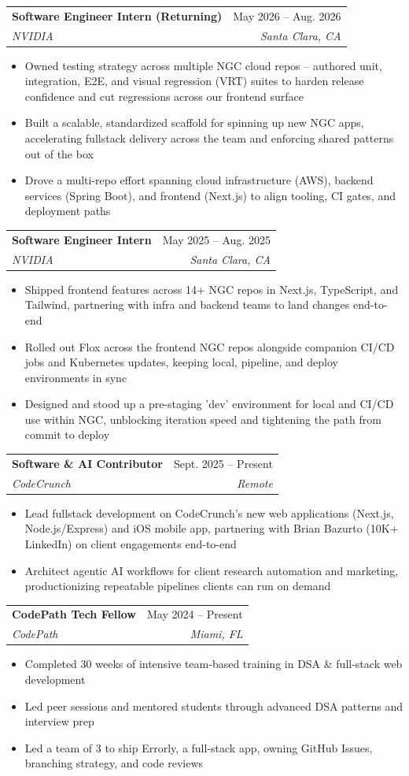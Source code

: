 \documentclass[letterpaper,9pt]{extarticle}
\makeatletter
\newcommand{\resumeItem}[1]{
  \item\small{
    {#1 \vspace{-3pt}}
  }
}
\newcommand{\resumeSubheading}[4]{
  \vspace{0pt}\item
    \begin{tabular*}{0.97\textwidth}[t]{l@{\extracolsep{\fill}}r}
      \textbf{#1} & #2 \\
      \textit{\small#3} & \textit{\small #4} \\
    \end{tabular*}\vspace{-8pt}
}
\newcommand{\resumeItemListStart}{\begin{itemize}}
\newcommand{\resumeItemListEnd}{\end{itemize}\vspace{-6pt}}
\makeatother
\begin{document}
    \resumeSubheading
      {Software Engineer Intern (Returning)}{May 2026 -- Aug. 2026}
      {NVIDIA}{Santa Clara, CA}
      \resumeItemListStart
        \resumeItem{Owned testing strategy across multiple NGC cloud repos -- authored unit, integration, E2E, \newline and visual regression (VRT) suites to harden release confidence and cut regressions across our frontend surface}
        \resumeItem{Built a scalable, standardized scaffold for spinning up new NGC apps, \newline accelerating fullstack delivery across the team and enforcing shared patterns out of the box}
        \resumeItem{Drove a multi-repo effort spanning cloud infrastructure (AWS), backend services (Spring Boot), \newline and frontend (Next.js) to align tooling, CI gates, and deployment paths}
      \resumeItemListEnd

    \resumeSubheading
      {Software Engineer Intern}{May 2025 -- Aug. 2025}
      {NVIDIA}{Santa Clara, CA}
      \resumeItemListStart
        \resumeItem{Shipped frontend features across 14+ NGC repos in Next.js, TypeScript, and Tailwind, \newline partnering with infra and backend teams to land changes end-to-end}
        \resumeItem{Rolled out Flox across the frontend NGC repos alongside companion CI/CD jobs \newline and Kubernetes updates, keeping local, pipeline, and deploy environments in sync}
        \resumeItem{Designed and stood up a pre-staging 'dev' environment for local and CI/CD use within NGC, \newline unblocking iteration speed and tightening the path from commit to deploy}
      \resumeItemListEnd

    \resumeSubheading
      {Software \& AI Contributor}{Sept. 2025 -- Present}
      {CodeCrunch}{Remote}
      \resumeItemListStart
        \resumeItem{Lead fullstack development on CodeCrunch's new web applications (Next.js, Node.js/Express) and iOS mobile app, \newline partnering with Brian Bazurto (10K+ LinkedIn) on client engagements end-to-end}
        \resumeItem{Architect agentic AI workflows for client research automation and marketing, productionizing repeatable pipelines clients can run on demand}
      \resumeItemListEnd

    \resumeSubheading
      {CodePath Tech Fellow}{May 2024 -- Present}
      {CodePath}{Miami, FL}
      \resumeItemListStart
        \resumeItem{Completed 30 weeks of intensive team-based training in DSA \& full-stack web development}
        \resumeItem{Led peer sessions and mentored students through advanced DSA patterns and interview prep}
        \resumeItem{Led a team of 3 to ship Errorly, a full-stack app, owning GitHub Issues, branching strategy, and code reviews}
      \resumeItemListEnd
\end{document}
